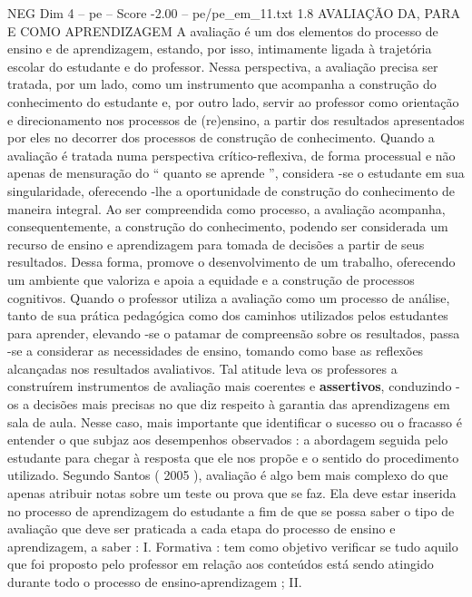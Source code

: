 \begin{textsample}{NEG Dim 4 – pe – Score -2.00 – pe/pe\_em\_11.txt}  \label{ex:f4_neg_008}
1.8 AVALIAÇÃO DA, PARA E COMO APRENDIZAGEM A avaliação é um dos elementos do processo de ensino e de aprendizagem, estando, por isso, intimamente ligada à trajetória escolar do estudante e do professor.
Nessa perspectiva, a avaliação precisa ser tratada, por um lado, como um instrumento que acompanha a construção do conhecimento do estudante e, por outro lado, servir ao professor como orientação e direcionamento nos processos de (re)ensino, a partir dos resultados apresentados por eles no decorrer dos processos de construção de conhecimento.
Quando a avaliação é tratada numa perspectiva crítico-reflexiva, de forma processual e não apenas de mensuração do “ quanto se aprende ”, considera -se o estudante em sua singularidade, oferecendo -lhe a oportunidade de construção do conhecimento de maneira integral.
Ao ser compreendida como processo, a avaliação acompanha, consequentemente, a construção do conhecimento, podendo ser considerada um recurso de ensino e aprendizagem para tomada de decisões a partir de seus resultados.
Dessa forma, promove o desenvolvimento de um trabalho, oferecendo um ambiente que valoriza e apoia a equidade e a construção de processos cognitivos.
Quando o professor utiliza a avaliação como um processo de análise, tanto de sua prática pedagógica como dos caminhos utilizados pelos estudantes para aprender, elevando -se o patamar de compreensão sobre os resultados, passa -se a considerar as necessidades de ensino, tomando como base as reflexões alcançadas nos resultados avaliativos.
Tal atitude leva os professores a construírem instrumentos de avaliação mais coerentes e \textbf{assertivos}, conduzindo -os a decisões mais precisas no que diz respeito à garantia das aprendizagens em sala de aula.
Nesse caso, mais importante que identificar o sucesso ou o fracasso é entender o que subjaz aos desempenhos observados : a abordagem seguida pelo estudante para chegar à resposta que ele nos propõe e o sentido do procedimento utilizado.
Segundo Santos ( 2005 ), avaliação é algo bem mais complexo do que apenas atribuir notas sobre um teste ou prova que se faz.
Ela deve estar inserida no processo de aprendizagem do estudante a fim de que se possa saber o tipo de avaliação que deve ser praticada a cada etapa do processo de ensino e aprendizagem, a saber : I.
Formativa : tem como objetivo verificar se tudo aquilo que foi proposto pelo professor em relação aos conteúdos está sendo atingido durante todo o processo de ensino-aprendizagem ; II.

\end{textsample}
